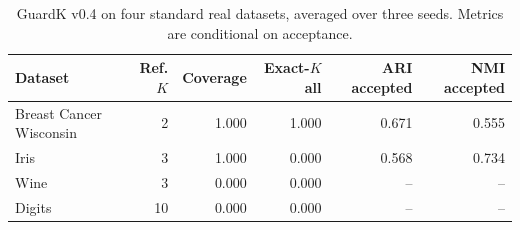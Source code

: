 \begin{table}[t]
\centering
\caption{GuardK v0.4 on four standard real datasets, averaged over three seeds. Metrics are conditional on acceptance.}
\label{tab:real-guardk}
\begin{tabular}{lrrrrr}
\toprule
Dataset & Ref. $K$ & Coverage & Exact-$K$ all & ARI accepted & NMI accepted\\
\midrule
Breast Cancer Wisconsin & 2 & 1.000 & 1.000 & 0.671 & 0.555\\
Iris & 3 & 1.000 & 0.000 & 0.568 & 0.734\\
Wine & 3 & 0.000 & 0.000 & -- & --\\
Digits & 10 & 0.000 & 0.000 & -- & --\\
\bottomrule
\end{tabular}
\end{table}
